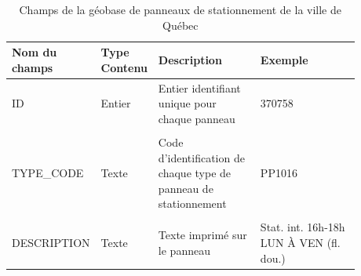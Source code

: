 \begin{landscape}
      \begin{table}[h!]
        \centering
        \begin{tabular}{p{0.18\linewidth} | p{0.1\linewidth} | p{0.3\linewidth} | p{0.3\linewidth}} 
        \hline
        Nom du champs & Type Contenu & Description  & Exemple\\ 
        \hline
        ID             & Entier    & Entier identifiant unique pour chaque panneau  & 370758 \\ 
        & & & \\
        TYPE\_CODE      & Texte     & Code d'identification de chaque type de panneau de stationnement & PP1016\\
        & & & \\
        DESCRIPTION     & Texte     & Texte imprimé sur le panneau & Stat. int. 16h-18h LUN À VEN (fl. dou.)\\
        \hline
        \end{tabular}
        \caption{Champs de la géobase de panneaux de stationnement de la ville de Québec \parencite{VilledeQuebec:PanneauxSignalisation:2024}}
        \label{tab:champs_geobase_stationnement_quebec}
      \end{table}
      \end{landscape}
